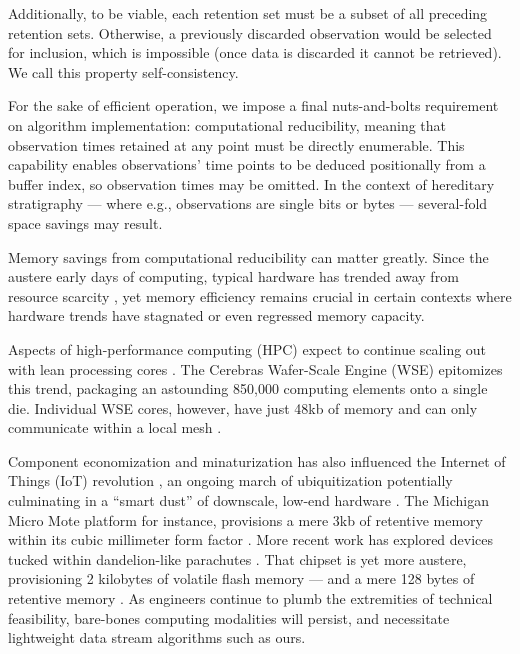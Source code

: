 Additionally, to be viable, each retention set must be a subset of all preceding retention sets.
Otherwise, a previously discarded observation would be selected for inclusion, which is impossible (once data is discarded it cannot be retrieved).
We call this property self-consistency.

For the sake of efficient operation, we impose a final nuts-and-bolts requirement on algorithm implementation: computational reducibility, meaning that observation times retained at any point must be directly enumerable.
This capability enables observations' time points to be deduced positionally from a buffer index, so observation times may be omitted.
In the context of hereditary stratigraphy --- where e.g., observations are single bits or bytes --- several-fold space savings may result.

Memory savings from computational reducibility can matter greatly.
Since the austere early days of computing, typical hardware has trended away from resource scarcity \citep{kushida2015cloud}, yet memory efficiency remains crucial in certain contexts where hardware trends have stagnated or even regressed memory capacity.

Aspects of high-performance computing (HPC) expect to continue scaling out with lean processing cores \citep{sutter2005free,morgenstern2021unparalleled}.
The Cerebras Wafer-Scale Engine (WSE) epitomizes this trend, packaging an astounding 850,000 computing elements onto a single die.
Individual WSE cores, however, have just 48kb of memory and can only communicate within a local mesh \citep{cerebras2021wafer,lauterbach2021path}.

Component economization and minaturization has also influenced the Internet of Things (IoT) revolution \citep{rfc7228,ojo2018review}, an ongoing march of ubiquitization potentially culminating in a ``smart dust'' of downscale, low-end hardware \citep{warneke2001smart}.
The Michigan Micro Mote platform for instance, provisions a mere 3kb of retentive memory within its cubic millimeter form factor \citep{lee2012modular}.
More recent work has explored devices tucked within dandelion-like parachutes \citep{iyer2022wind}.
That chipset is yet more austere, provisioning 2 kilobytes of volatile flash memory --- and a mere 128 bytes of retentive memory \citep{microchip2014atiny20}.
As engineers continue to plumb the extremities of technical feasibility, bare-bones computing modalities will persist, and necessitate lightweight data stream algorithms such as ours.

